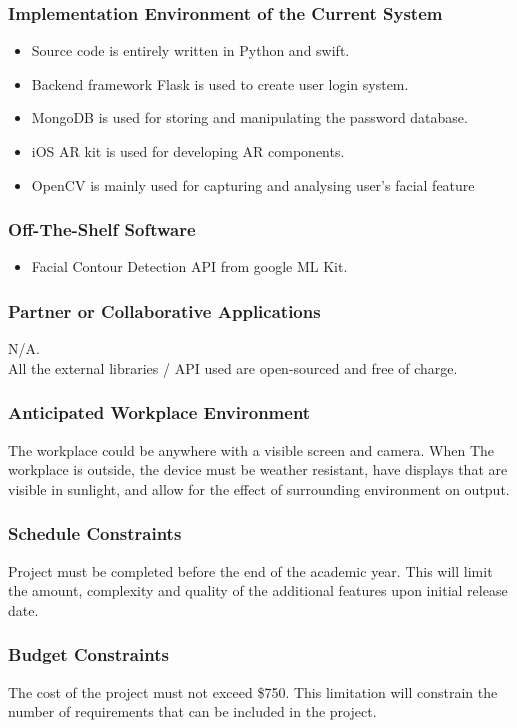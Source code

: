 \documentclass[12pt]{article}
\begin{document}
\subsubsection{Implementation Environment of the Current System}
\begin{itemize}
    \item Source code is entirely written in Python and swift.
    \item Backend framework Flask is used to create user login system.
    \item MongoDB is used for storing and manipulating the password database.
    \item iOS AR kit is used for developing AR components.
    \item OpenCV is mainly used for capturing and analysing user's facial feature
\end{itemize}
\subsubsection{Off-The-Shelf Software}
\begin{itemize}
    \item Facial Contour Detection API from google ML Kit.
\end{itemize}
\subsubsection{Partner or Collaborative Applications}
N/A. \\All the external libraries / API used are open-sourced and free of charge.
\subsubsection{Anticipated Workplace Environment}
The workplace could be anywhere with a visible screen and camera. When The workplace is outside, the device must be weather resistant, have displays that are visible in sunlight, and allow for the effect of surrounding environment on output.
\subsubsection{Schedule Constraints}
Project must be completed before the end of the academic year. This will limit the amount, complexity and quality of the additional features upon initial release date.
\subsubsection{Budget Constraints}
The cost of the project must not exceed \$750. This limitation will constrain the number of requirements that can be included in the project.
  
\end{document}
